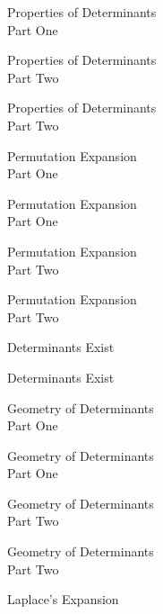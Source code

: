 \documentclass{titlescreen}
\begin{document}
\begin{videotitle}
  Properties of Determinants \\[1ex]
  Part One
\end{videotitle}
\begin{videoend}
  Properties of Determinants \\[1ex]
  Part Two
\end{videoend}

\begin{videotitle}
  Properties of Determinants \\[1ex]
  Part Two
\end{videotitle}
\begin{videoend}
  Permutation Expansion \\[1ex]
  Part One
\end{videoend}

\begin{videotitle}
  Permutation Expansion \\[1ex]
  Part One
\end{videotitle}
\begin{videoend}
  Permutation Expansion \\[1ex]
  Part Two
\end{videoend}

\begin{videotitle}
  Permutation Expansion \\[1ex]
  Part Two
\end{videotitle}
\begin{videoend}
  Determinants Exist
\end{videoend}

\begin{videotitle}
  Determinants Exist
\end{videotitle}
\begin{videoend}
  Geometry of Determinants \\[1ex]
  Part One
\end{videoend}

\begin{videotitle}
  Geometry of Determinants \\[1ex]
  Part One
\end{videotitle}
\begin{videoend}
  Geometry of Determinants \\[1ex]
  Part Two
\end{videoend}

\begin{videotitle}
  Geometry of Determinants \\[1ex]
  Part Two
\end{videotitle}
\begin{videoend}
  Laplace's Expansion
\end{videoend}
\end{document}
